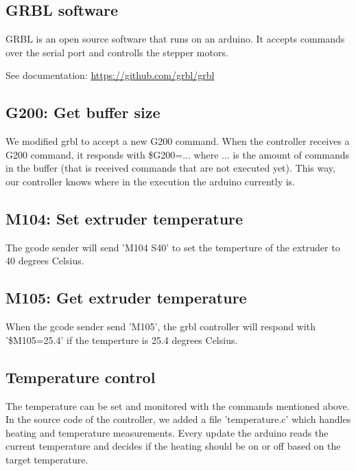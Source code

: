 \subsection{GRBL software}

GRBL is an open source software that runs on an arduino.
It accepts commands over the serial port and controlls the stepper motors.

See documentation: \url{https://github.com/grbl/grbl}

\subsection{G200: Get buffer size}

We modified grbl to accept a new G200 command.
When the controller receives a G200 command, it responds
with \$G200=... where ... is the amount of commands in the
buffer (that is received commands that are not executed yet).
This way, our controller knows where in the execution the arduino
currently is.

\subsection{M104: Set extruder temperature}

The gcode sender will send 'M104 S40' to set the temperture of the extruder to 40 degrees Celsius.

\subsection{M105: Get extruder temperature}

When the gcode sender send 'M105', the grbl controller
will respond with '\$M105=25.4' if the temperture is 25.4 degrees
Celsius.

\subsection{Temperature control}

The temperature can be set and monitored with the commands mentioned above.
In the source code of the controller, we added a file 'temperature.c' which
handles heating and temperature measurements. Every update the arduino
reads the current temperature and decides if the heating should be on or off
based on the target temperature.